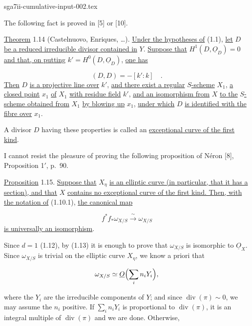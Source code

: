 \begin{filecontents*}{sga7ii-cumulative-input-002.tex}

The following fact is proved in [5] or [10].

\underline{Theorem} 1.14 (Castelnuovo, Enriques, \ldots).
\underline{Under the hypotheses of} (1.1), \underline{let} $D$
\underline{be a reduced irreducible divisor contained in} $Y$.
\underline{Suppose that} $H^1(D,\underline{O}_D)=0$ \underline{and that, on putting}
$k'=H^0(D,\underline{O}_D)$, \underline{one has}

\begin{equation*}
(D,D)=-[k':k] \quad .
\end{equation*}
\underline{Then} $D$ \underline{is a projective line over} $k'$, \underline{and
there exist a regular} $S$\underline{-scheme} $X_1$, \underline{a closed point}
$x_1$ \underline{of} $X_1$ \underline{with residue field} $k'$, \underline{and an
isomorphism from} $X$ \underline{to the} $S$\underline{-scheme obtained from}
$X_1$ \underline{by blowing up} $x_1$, \underline{under which} $D$
\underline{is identified with the fibre over} $x_1$.

A divisor $D$ having these properties is called an \underline{exceptional curve
of the first kind}.

I cannot resist the pleasure of proving the following proposition of Néron [8],
Proposition 1$'$, p.~90.

\underline{Proposition} 1.15. \underline{Suppose that} $X_\eta$
\underline{is an elliptic curve (in particular, that it has a section), and that}
$X$ \underline{contains no exceptional curve of the first kind.  Then, with the
notation of} (1.10.1), \underline{the canonical map}

\begin{equation*}
f^*f_*\omega_{X/S}\xrightarrow{\;\sim\;}\omega_{X/S}
\end{equation*}
\underline{is universally an isomorphism}.

Since $d=1$ (1.12), by (1.13) it is enough to prove that $\omega_{X/S}$ is
isomorphic to $\underline{O}_X$.  Since $\omega_{X/S}$ is trivial on the elliptic
curve $X_\eta$, we know a priori that

\begin{equation*}
\omega_{X/S}\simeq\underline{O}\Bigl(\sum_i n_iY_i\Bigr),
\end{equation*}


where the $Y_i$ are the irreducible components of $Y$; and since
$\operatorname{div}(\pi)\sim0$, we may assume the $n_i$ positive.  If
$\sum_i n_iY_i$ is proportional to $\operatorname{div}(\pi)$, it is an integral
multiple of $\operatorname{div}(\pi)$ and we are done.  Otherwise,


\end{filecontents*}
